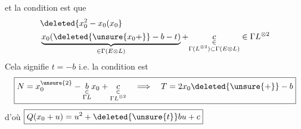 et la condition est que
\[
\begin{aligned}&\deleted{x_0^2-x_0(x_0}\\&\underbrace{x_0(\deleted{\unsure{x_0+}}-b-t)}_{\in\Gamma(E\otimes L)}+\underset{\substack{\in\\\Gamma(L^{\otimes2})\subset\Gamma(E\otimes L)}}c\in\Gamma L^{\otimes2}\end{aligned}
\]
Cela signifie $\boxed{t=-b}$ i.e. la condition est 
\[
\boxed{N=x_0^{\unsure{2}}-\underset{\substack{\in\\\Gamma L}}b x_0+\underset{\substack{\in\\\Gamma L^{\otimes2}}}c\quad\Longrightarrow\quad T=2x_0\deleted{\unsure{+}}-b}
\]
d'où $\boxed{Q(x_0+u)=u^2+\deleted{\unsure{t}}bu+c}$
